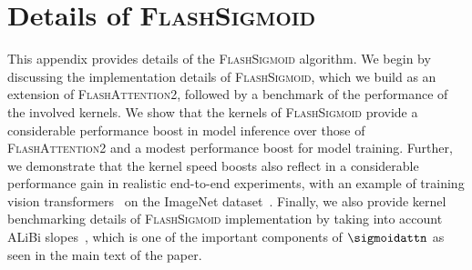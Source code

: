 \section{Details of \textsc{FlashSigmoid}}
\label{sec:DetailsOfFlashSigmoid}
\noindent This appendix provides details of the \textsc{FlashSigmoid} algorithm.
We begin by discussing the implementation details of \textsc{FlashSigmoid}, which we build as an extension of \textsc{FlashAttention2}, followed by a benchmark of the performance of the involved kernels.
We show that the kernels of \textsc{FlashSigmoid} provide a considerable performance boost in model inference over those of \textsc{FlashAttention2} and a modest performance boost for model training. 
Further, we demonstrate that the kernel speed boosts also reflect in a considerable performance gain in realistic end-to-end experiments, with an example of training vision transformers~\citep{DBLP:conf/iclr/DosovitskiyB0WZ21} on the ImageNet dataset~\citep{DBLP:conf/cvpr/DengDSLL009}. 
Finally, we also provide kernel benchmarking details of \textsc{FlashSigmoid} implementation by taking into account ALiBi slopes~\citep{DBLP:conf/iclr/PressSL22}, which is one of the important components of $\sigmoidattn$ as seen in the main text of the paper. 

